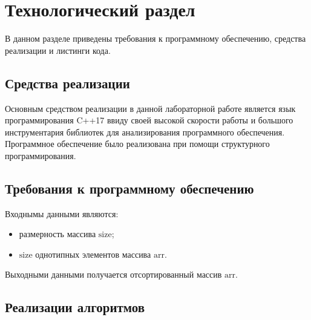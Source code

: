 \chapter{Технологический раздел}
\label{cha:impl}

В данном разделе приведены требования к программному обеспечению, средства реализации и листинги кода. 

\section{Средства реализации}
Основным средством реализации в данной лабораторной работе является язык программирования C++17 \cite{iso_2017} ввиду своей высокой скорости работы и большого инструментария библиотек для анализирования программного обеспечения. Программное обеспечение было реализована при помощи структурного программирования.

\section{Требования к программному обеспечению}
Входнымы данными являются:
\begin{itemize}
    \item размерность массива $\text{size}$;
    \item $\text{size}$ однотипных элементов массива $\text{arr}$.
\end{itemize}
Выходными данными получается отсортированный массив $\text{arr}$.



\section{Реализации алгоритмов}

